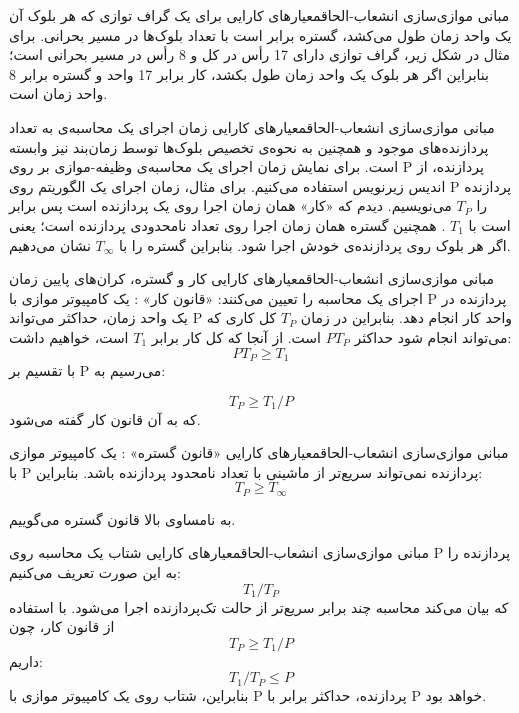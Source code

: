 \begin{itemframe-s}{مبانی موازی‌سازی انشعاب-الحاق}{معیارهای کارایی}
\itm
برای یک گراف توازی که هر بلو‌ک آن یک واحد زمان طول می‌کشد، گستره برابر است با تعداد بلوک‌ها در مسیر بحرانی.
\itm
برای مثال در شکل زیر، گراف توازی دارای 17 رأس در کل و 8 رأس در مسیر بحرانی است؛ بنابراین اگر هر بلوک یک واحد زمان طول بکشد، کار برابر 17 واحد و گستره برابر 8 واحد زمان است.

\end{itemframe-s}


\begin{itemframe-s}{مبانی موازی‌سازی انشعاب-الحاق}{معیارهای کارایی}
\itm
زمان اجرای یک محاسبه‌ی به تعداد پردازنده‌های موجود و همچنین به نحوه‌ی تخصیص بلوک‌ها توسط زمان‌بند نیز وابسته است.
\itm
برای نمایش زمان اجرای یک محاسبه‌ی وظیفه-موازی بر روی P پردازنده، از اندیس زیرنویس استفاده می‌کنیم. برای مثال، زمان اجرای یک الگوریتم روی P پردازنده را
$T_P$
می‌نویسیم.
\itm
دیدم که «کار» همان زمان اجرا روی یک پردازنده است پس برابر است با
$T_1$ .
همچنین گستره همان زمان اجرا روی تعداد نامحدودی پردازنده است؛ یعنی اگر هر بلوک روی پردازنده‌ی خودش اجرا شود. بنابراین گستره را با
$T_∞$
نشان می‌دهیم.
\end{itemframe-s}


\begin{itemframe-s}{مبانی موازی‌سازی انشعاب-الحاق}{معیارهای کارایی}
\itm
کار و گستره، کران‌های پایین زمان اجرای یک محاسبه را تعیین می‌کنند:
\itm[1]
«قانون کار»
:
یک کامپیوتر موازی با P پردازنده در یک واحد زمان، حداکثر می‌تواند P واحد کار انجام دهد. بنابراین در زمان
$T_P$
کل کاری که می‌تواند انجام شود حداکثر
$P T_P$
است. از آنجا که کل کار برابر
$T_1$
است، خواهیم داشت:
$$P T_P ≥ T_1$$
با تقسیم بر P می‌رسیم به:

$$T_P ≥ T_1 / P$$
که به آن قانون کار گفته می‌شود.
\end{itemframe-s}


\begin{itemframe-s}{مبانی موازی‌سازی انشعاب-الحاق}{معیارهای کارایی}
\itm[2]
«قانون گستره»
:
یک کامپیوتر موازی با P
پردازنده نمی‌تواند سریع‌تر از ماشینی با تعداد نامحدود پردازنده باشد. بنابراین:
$$T_P ≥ T_∞$$

به نامساوی بالا قانون گستره می‌گوییم.
\end{itemframe-s}


\begin{itemframe-s}{مبانی موازی‌سازی انشعاب-الحاق}{معیارهای کارایی}
\itm
شتاب
یک محاسبه روی P پردازنده را به این صورت تعریف می‌کنیم:
$$T_1 / T_P$$
که بیان می‌کند محاسبه چند برابر سریع‌تر از حالت تک‌پردازنده اجرا می‌شود.
\itm
با استفاده از قانون کار، چون
$$T_P ≥ T_1 / P$$
داریم:
$$T_1 / T_P ≤ P$$
بنابراین، شتاب روی یک کامپیوتر موازی با P
پردازنده، حداکثر برابر با P
خواهد بود.
\end{itemframe-s}



